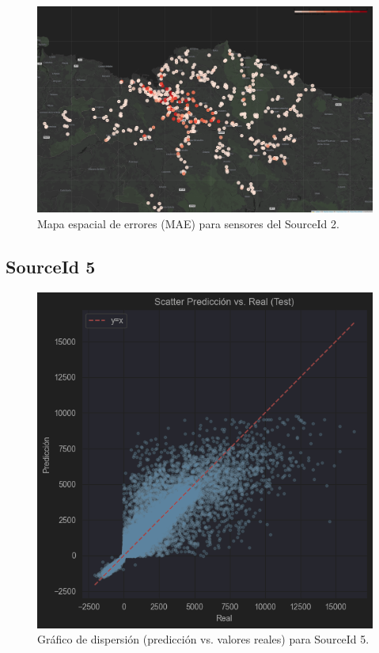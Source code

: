 \begin{figure}[H]
	\centering
	\includegraphics[width=0.9\linewidth]{includes/cap5/graphs/advanced/sid2_meters_error_rate_map.png}
	\caption{Mapa espacial de errores (MAE) para sensores del SourceId 2.}
	\label{fig:sid2_error_map}
\end{figure}

\subsection*{SourceId 5}

\begin{figure}[H]
	\centering
	\includegraphics[width=0.75\linewidth]{includes/cap5/graphs/advanced/sid5_scatter_predicted_vs_actual.png}
	\caption{Gráfico de dispersión (predicción vs. valores reales) para SourceId 5.}
	\label{fig:sid5_scatter}
\end{figure}

